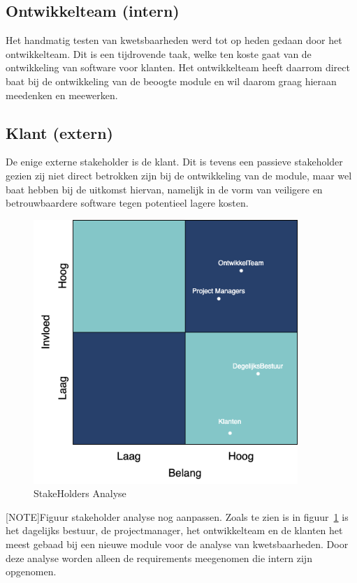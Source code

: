 \subsection{Ontwikkelteam (intern)}\label{subsec:ontwikkelteam-(intern)1}
Het handmatig testen van kwetsbaarheden werd tot op heden gedaan door het ontwikkelteam. Dit is een tijdrovende taak, welke ten koste gaat van de ontwikkeling van software voor klanten. Het ontwikkelteam heeft daarrom direct baat bij de ontwikkeling van de beoogte module en wil daarom graag hieraan meedenken en meewerken.

\subsection{Klant (extern)}\label{subsec:klant-(extern)1}
De enige externe stakeholder is de klant. Dit is tevens een passieve stakeholder gezien zij niet direct betrokken zijn bij de ontwikkeling van de module, maar wel baat hebben bij de uitkomst hiervan, namelijk in de vorm van veiligere en betrouwbaardere software tegen potentieel lagere kosten.
\begin{figure}[H]
    \myfloatalign
    \includegraphics[width=10cm]{gfx/stakeholderanalyse}
    \caption{StakeHolders Analyse}
    \label{fig:StakeholderAnalyse1}
\end{figure}
[NOTE]Figuur stakeholder analyse nog aanpassen.
Zoals te zien is in figuur~\ref{fig:StakeholderAnalyse1} is het dagelijks bestuur, de projectmanager, het ontwikkelteam en de klanten het meest gebaad bij een nieuwe module voor de analyse van kwetsbaarheden.
Door deze analyse worden alleen de requirements meegenomen die intern zijn opgenomen.


